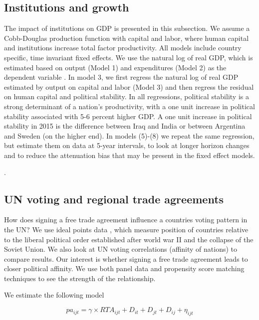 \subsection{Institutions and growth}
The impact of institutions on GDP is presented in this subsection. We assume a Cobb-Douglas production function with capital and labor, where human capital and institutions increase total factor productivity. All models include country specific, time invariant fixed effects. We use the natural log of real GDP, which is estimated based on output (Model 1) and expenditures (Model 2) as the dependent variable \citep{Feenstra2015TheTable}. In model 3, we first regress the natural log of real GDP estimated by output on capital and labor (Model 3) and then regress the residual on human capital and political stability. In all regressions, political stability is a strong determinant of a nation's productivity, with a one unit increase in political stability associated with 5-6 percent higher GDP. A one unit increase in political stability in 2015 is the difference between Iraq and India  or between Argentina and Sweden (on the higher end). In models (5)-(8) we repeat the same regression, but estimate them on data at 5-year intervals, to look at longer horizon changes and to reduce the attenuation bias that may be present in the fixed effect models.

. 

\subsection{UN voting and regional trade agreements}
How does signing a free trade agreement influence a countries voting pattern in the UN? We use ideal points data \cite{Bailey2017EstimatingData}, which measure position of countries relative to the liberal political order established after world war II and the collapse of the Soviet Union. We also look at UN voting correlations (affinity of nations) to compare results. Our interest is whether signing a free trade agreement leads to closer political affinity. We use both panel data and propensity score matching techniques to see the strength of the relationship.

We estimate the following model

\begin{equation}
    pa_{ijt}=\gamma \times RTA_{ijt}+D_{it}+D_{jt}+D_{ij}+\eta_{ijt}
\end{equation}

